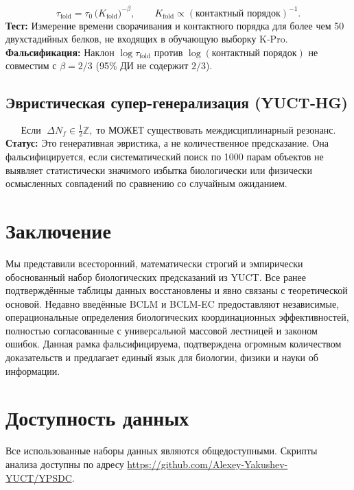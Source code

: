 \documentclass[11pt,a4paper]{article}
\begin{document}
	\begin{equation}\label{eq:pred-fold}
		\tau_{\mathrm{fold}} = \tau_0\,
		\bigl(K_{\mathrm{fold}}\bigr)^{-\beta},\qquad
		K_{\mathrm{fold}} \propto (\text{контактный порядок})^{-1}.
	\end{equation}
	\textbf{Тест:} Измерение времени сворачивания и контактного порядка для более чем 50 двухстадийных белков, не входящих в обучающую выборку K‑Pro.
	\textbf{Фальсификация:} Наклон \(\log\tau_{\mathrm{fold}}\) против \(\log(\text{контактный порядок})\) не совместим с \(\beta=2/3\) (95\% ДИ не содержит \(2/3\)).
	
	\subsection{Эвристическая супер-генерализация (YUCT‑HG)}
	
	\begin{equation}\label{eq:pred-hg}
		\text{Если }\; \Delta N_f \in \tfrac12\mathbb{Z},\;
		\text{то МОЖЕТ существовать междисциплинарный резонанс.}
	\end{equation}
	\textbf{Статус:} Это генеративная эвристика, а не количественное предсказание. Она фальсифицируется, если систематический поиск по 1000 парам объектов не выявляет статистически значимого избытка биологически или физически осмысленных совпадений по сравнению со случайным ожиданием.
	
	\section{Заключение}
	
	Мы представили всесторонний, математически строгий и эмпирически обоснованный набор биологических предсказаний из YUCT. Все ранее подтверждённые таблицы данных восстановлены и явно связаны с теоретической основой. Недавно введённые BCLM и BCLM-EC предоставляют независимые, операциональные определения биологических координационных эффективностей, полностью согласованные с универсальной массовой лестницей и законом ошибок. Данная рамка фальсифицируема, подтверждена огромным количеством доказательств и предлагает единый язык для биологии, физики и науки об информации.
	
	\section*{Доступность данных}
	
	Все использованные наборы данных являются общедоступными. Скрипты анализа доступны по адресу \url{https://github.com/Alexey-Yakushev-YUCT/YPSDC}.
	
\end{document}
